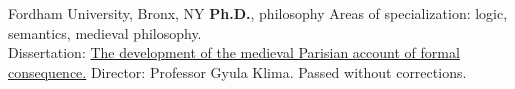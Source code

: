{%
	Fordham University, Bronx, NY}
{%
	\textbf{Ph.D.}, philosophy}
{%
	Areas of specialization: logic, semantics, medieval philosophy.
	\\ Dissertation: \href{https://www.academia.edu/32939933/The_development_of_the_medieval_Parisian_account_of_formal_consequence}{The development of the medieval Parisian account of formal consequence.} Director: Professor Gyula Klima. Passed without corrections.}
